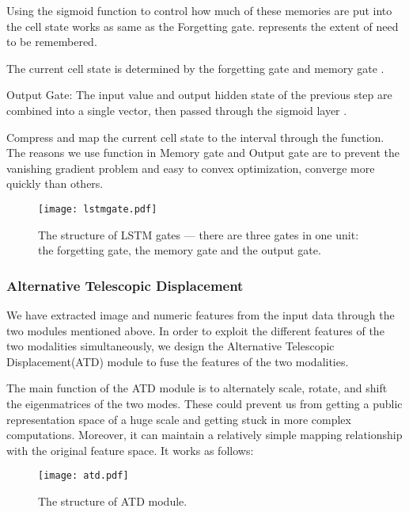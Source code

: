 \documentclass{ecai}
\begin{document}
Using the sigmoid  function to control how much of these memories are put into the cell state works as same as the Forgetting gate.  represents the extent of   need to be remembered. 

The current cell state  is determined by the forgetting gate and memory gate .

Output Gate: The input value  and output hidden state of the previous step  are combined into a single vector, then passed through the sigmoid layer .

Compress and map the current cell state to the interval  through the  function.\\

The reasons we use  function in Memory gate and Output gate are to prevent the vanishing gradient problem and easy to convex optimization, converge more quickly than others.







\begin{figure}[h]
    \centering
    \texttt{[image: lstmgate.pdf]}
    \caption{The structure of LSTM gates --- there are three gates in one unit: the forgetting gate, the memory gate and the output gate.}
    \label{fig:network}
\end{figure}

\subsubsection{Alternative Telescopic Displacement}
We have extracted image and numeric features from the input data through the two modules mentioned above. In order to exploit the different features of the two modalities simultaneously, we design the Alternative Telescopic Displacement(ATD) module to fuse the features of the two modalities.

The main function of the ATD module is to alternately scale, rotate, and shift the eigenmatrices of the two modes. These could prevent us from getting a public representation space of a huge scale and getting stuck in more complex computations. Moreover, it can maintain a relatively simple mapping relationship with the original feature space. It works as follows:
\begin{figure}
    \centering
    \texttt{[image: atd.pdf]}
    \caption{The structure of ATD module. }
    \label{fig:network}
\end{figure}
\end{document}

